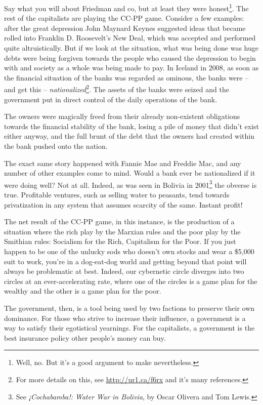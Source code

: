 Say what you will about Friedman and co, but at least they were
honest\footnote{Well, no. But it's a good argument to make nevertheless.}. The
rest of the capitalists are playing the CC-PP game. Consider a few examples:
after the great depression John Maynard Keynes suggested ideas that became
rolled into Franklin D. Roosevelt's New Deal, which was accepted and performed
quite altruistically. But if we look at the situation, what was being done was
huge debts were being forgiven towards the people who caused the depression to
begin with and society as a whole was being made to pay. In Iceland in 2008, as
soon as the f\hbox{}inancial situation of the banks was regarded as ominous, 
the banks were – and get this – \textit{nationalized}\footnote{For more details
on this, see \url{http://ur1.ca/f6rx} and it's many references.}. The assets of
the banks were seized and the government put in direct control of the daily
operations of the bank.

The owners were magically freed from their already non-existent obligations
towards the f\hbox{}inancial stability of the bank, losing a pile of money that
didn't exist either anyway, and the full brunt of the debt that the owners had
created within the bank pushed onto the nation.

The exact same story happened with Fannie Mae and Freddie Mac, and any number 
of other examples come to mind. Would a bank ever be nationalized if it were
doing well? Not at all. Indeed, as was seen in Bolivia in 2001\footnote{See
\textit{¡Cochabamba!: Water War in Bolivia}, by Oscar Olivera and Tom Lewis.}
the obverse is true. Prof\hbox{}itable ventures, such as selling water to
peasants, tend towards privatization in any system that assumes scarcity of the
same.  Instant prof\hbox{}it!

The net result of the CC-PP game, in this instance, is the production of a
situation where the rich play by the Marxian rules and the poor play by the
Smithian rules: Socialism for the Rich, Capitalism for the Poor. If you just
happen to be one of the unlucky sods who doesn't own stocks and wear a \$5,000
suit to work, you're in a dog-eat-dog world and getting beyond that point will
always be problematic at best. Indeed, our cybernetic circle diverges into two
circles at an ever-accelerating rate, where one of the circles is a game plan
for the wealthy and the other is a game plan for the poor.

The government, then, is a tool being used by two factions to preserve their 
own dominance. For those who strive to increase their inf\hbox{}luence, a
government is a way to satisfy their egotistical yearnings. For the 
capitalists, a government is the best insurance policy other people's money can
buy.


